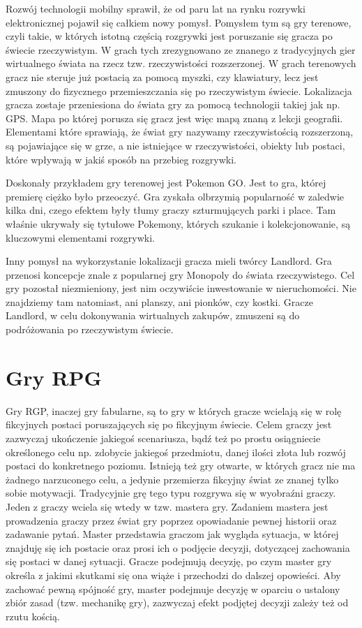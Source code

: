 \documentclass	{xmgr}
\begin{document}
Rozwój technologii mobilny sprawił, że od paru lat na rynku rozrywki elektronicznej pojawił się całkiem nowy pomysł. Pomysłem tym są gry terenowe, czyli takie, w których istotną częścią rozgrywki jest poruszanie się gracza po świecie rzeczywistym. W grach tych zrezygnowano ze znanego z tradycyjnych gier wirtualnego świata na rzecz tzw. rzeczywistości rozszerzonej. W grach terenowych gracz nie steruje już postacią za pomocą myszki, czy klawiatury, lecz jest zmuszony do fizycznego przemieszczania się po rzeczywistym świecie. Lokalizacja gracza zostaje przeniesiona do świata gry za pomocą technologii takiej jak np. GPS. Mapa po której porusza się gracz jest więc mapą znaną z lekcji geografii. Elementami które sprawiają, że świat gry nazywamy rzeczywistością rozszerzoną, są pojawiające się w grze, a nie istniejące w rzeczywistości, obiekty lub postaci, które wpływają w jakiś sposób na przebieg rozgrywki.

Doskonały przykładem gry terenowej jest Pokemon GO. Jest to gra, której premierę ciężko było przeoczyć. Gra zyskała olbrzymią popularność w zaledwie kilka dni, czego efektem były tłumy graczy szturmujących parki i place. Tam właśnie ukrywały się tytułowe Pokemony, których szukanie i kolekcjonowanie, są kluczowymi elementami rozgrywki.

Inny pomysł na wykorzystanie lokalizacji gracza mieli twórcy Landlord. Gra przenosi koncepcje znale z popularnej gry Monopoly do świata rzeczywistego. Cel gry pozostał niezmieniony, jest nim oczywiście inwestowanie w nieruchomości. Nie znajdziemy tam natomiast, ani planszy, ani pionków, czy kostki. Gracze Landlord, w celu dokonywania wirtualnych zakupów, zmuszeni są do podróżowania po rzeczywistym świecie.

\section{Gry RPG}

Gry RGP, inaczej gry fabularne, są to gry w których gracze wcielają się w rolę fikcyjnych postaci poruszających się po fikcyjnym świecie.  Celem graczy jest zazwyczaj ukończenie jakiegoś scenariusza, bądź też po prostu osiągniecie określonego celu np. zdobycie jakiegoś przedmiotu, danej ilości złota lub rozwój postaci do konkretnego poziomu. Istnieją też gry otwarte, w których gracz nie ma żadnego narzuconego celu, a jedynie przemierza fikcyjny świat ze znanej tylko sobie motywacji. Tradycyjnie grę tego typu rozgrywa się w wyobraźni graczy. Jeden z graczy wciela się wtedy w tzw. mastera gry. Zadaniem mastera jest prowadzenia graczy przez świat gry poprzez opowiadanie pewnej historii oraz zadawanie pytań. Master przedstawia graczom jak wygląda sytuacja, w której znajduję się ich postacie oraz prosi ich o podjęcie decyzji, dotyczącej zachowania się postaci w danej sytuacji. Gracze podejmują decyzję, po czym master gry określa z jakimi skutkami się ona wiąże i przechodzi do dalszej opowieści. Aby zachować pewną spójność gry, master podejmuje decyzję w oparciu o ustalony zbiór zasad (tzw. mechanikę gry), zazwyczaj efekt podjętej decyzji zależy też od rzutu kością.
\end{document}
